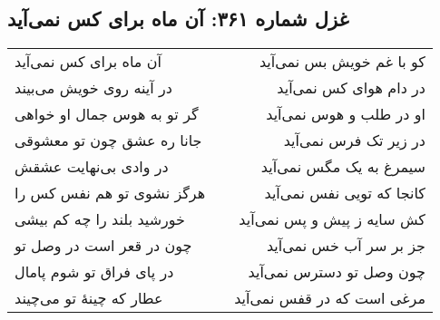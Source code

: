 \begin{center}
\section*{غزل شماره ۳۶۱: آن ماه برای کس نمی‌آید}
\label{sec:361}
\begin{longtable}{l p{0.5cm} r}
آن ماه برای کس نمی‌آید
&&
کو با غم خویش بس نمی‌آید
\\
در آینه روی خویش می‌بیند
&&
در دام هوای کس نمی‌آید
\\
گر تو به هوس جمال او خواهی
&&
او در طلب و هوس نمی‌آید
\\
جانا ره عشق چون تو معشوقی
&&
در زیر تک فرس نمی‌آید
\\
در وادی بی‌نهایت عشقش
&&
سیمرغ به یک مگس نمی‌آید
\\
هرگز نشوی تو هم نفس کس را
&&
کانجا که تویی نفس نمی‌آید
\\
خورشید بلند را چه کم بیشی
&&
کش سایه ز پیش و پس نمی‌آید
\\
چون در قعر است در وصل تو
&&
جز بر سر آب خس نمی‌آید
\\
در پای فراق تو شوم پامال
&&
چون وصل تو دسترس نمی‌آید
\\
عطار که چینهٔ تو می‌چیند
&&
مرغی است که در قفس نمی‌آید
\\
\end{longtable}
\end{center}
